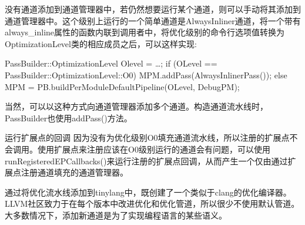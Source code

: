 \begin{enumerate}
没有通道添加到通道管理器中，若仍然想要运行某个通道，则可以手动将其添加到通道管理器中。这个级别上运行的一个简单通道是AlwaysInliner通道，将一个带有always\_inline属性的函数内联到调用者中，将优化级别的命令行选项值转换为OptimizationLevel类的相应成员之后，可以这样实现:

\begin{cpp}
PassBuilder::OptimizationLevel Olevel = …;
if (OLevel == PassBuilder::OptimizationLevel::O0)
    MPM.addPass(AlwaysInlinerPass());
else
    MPM = PB.buildPerModuleDefaultPipeline(OLevel, DebugPM);
\end{cpp}

当然，可以以这种方式向通道管理器添加多个通道。构造通道流水线时，PassBuilder也使用addPass()方法。

\end{enumerate}

\begin{myTip}{运行扩展点的回调}
因为没有为优化级别O0填充通道流水线，所以注册的扩展点不会调用。使用扩展点来注册应该在O0级别运行的通道会有问题，可以使用runRegisteredEPCallbacks()来运行注册的扩展点回调，从而产生一个仅由通过扩展点注册通道填充的通道管理器。
\end{myTip}

通过将优化流水线添加到tinylang中，既创建了一个类似于clang的优化编译器。LLVM社区致力于在每个版本中改进优化和优化管道，所以很少不使用默认管道。大多数情况下，添加新通道是为了实现编程语言的某些语义。





































